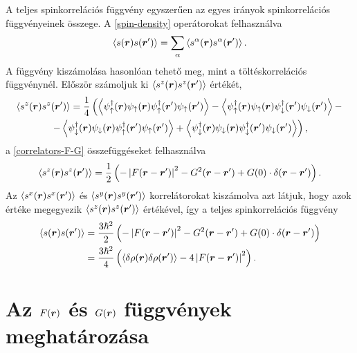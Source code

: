 \documentclass[a4paper,12pt,titlepage]{article}
\newcommand{\RR}{{\vb*{r}}}
\begin{document}
A teljes spinkorrelációs függvény egyszerűen az egyes irányok spinkorrelációs függvényeinek összege.  A \eqref{spin-density} operátorokat felhasználva
\begin{equation}
	\left< s(\RR) s(\RR^\prime) \right> = \sum_\alpha \left< s^\alpha(\RR) s^\alpha(\RR^\prime) \right>.
\end{equation}
A függvény kiszámolása hasonlóan tehető meg, mint a töltéskorrelációs függvénynél.  Először számoljuk ki $\expval{s^z(\RR) s^z(\RR^\prime)}$ értékét,
\begin{multline}
	\expval{s^z(\RR) s^z(\RR^\prime)} = \frac{1}{4} \left( \expval{\psi_\uparrow^\dagger(\RR) \psi_\uparrow(\RR) \psi_\uparrow^\dagger(\RR^\prime) \psi_\uparrow(\RR^\prime)} - \expval{\psi_\uparrow^\dagger(\RR) \psi_\uparrow(\RR) \psi_\downarrow^\dagger(\RR^\prime) \psi_\downarrow(\RR^\prime)} -
	\right. \\ \left. -
	\expval{\psi_\downarrow^\dagger(\RR) \psi_\downarrow(\RR) \psi_\uparrow^\dagger(\RR^\prime) \psi_\uparrow(\RR^\prime)} + \expval{\psi_\downarrow^\dagger(\RR) \psi_\downarrow(\RR) \psi_\downarrow^\dagger(\RR^\prime) \psi_\downarrow(\RR^\prime)} \right),
\end{multline}
a \eqref{correlators-F-G} összefüggéseket felhasználva
\begin{equation}
	\expval{s^z(\RR) s^z(\RR^\prime)} = \frac{1}{2} \left( -\left| F(\RR - \RR^\prime) \right|^2 - G^2(\RR - \RR^\prime) + G(0) \cdot \delta(\RR - \RR^\prime) \right).
\end{equation}
Az $\expval{s^x(\RR) s^x(\RR^\prime)}$ és $\expval{s^y(\RR) s^y(\RR^\prime)}$ korrelátorokat kiszámolva azt látjuk, hogy azok értéke megegyezik $\expval{s^z(\RR) s^z(\RR^\prime)}$ értékével, így a teljes spinkorrelációs függvény
\begin{equation}
\begin{split}
	\expval{s(\RR) s(\RR^\prime)} & = \frac{3 \hbar^2}{2} \left( -\left| F(\RR - \RR^\prime) \right|^2 - G^2(\RR - \RR^\prime) + G(0) \cdot \delta(\RR - \RR^\prime) \right) \\
	& = \frac{3 \hbar^2}{4} \left( \expval{\delta\rho(\RR) \delta\rho(\RR^\prime)} - 4 \left| F(\RR - \RR^\prime) \right|^2  \right).
\end{split}
\end{equation}


\section{Az $F(\RR)$ és $G(\RR)$ függvények meghatározása}
\end{document}
